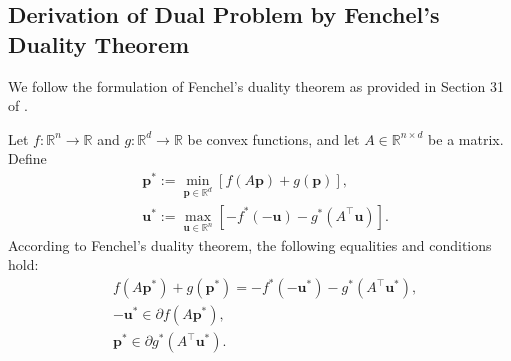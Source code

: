 %


\subsection{Derivation of Dual Problem by Fenchel's Duality Theorem} \label{app:fenchel}


We follow the formulation of Fenchel's duality theorem as provided in Section 31 of \cite{rockafellar1970convex}.

\begin{lemma} \label{lm:Fenchel-duality}
Let $f: \mathbb{R}^n\to\mathbb{R}$ and $g: \mathbb{R}^d\to\mathbb{R}$ be convex functions, and let $A\in\mathbb{R}^{n\times d}$ be a matrix. Define
\begin{align}
& \bm p^* := \min_{\bm p\in\mathbb{R}^d} [f(A\bm p) + g(\bm p)], \label{eq:FD-primal} \\
& \bm u^* := \max_{\bm u\in\mathbb{R}^n} [-f^*(-\bm u) - g^*(A^\top \bm u)]. \label{eq:FD-dual}
\end{align}
According to Fenchel's duality theorem, the following equalities and conditions hold:
\begin{align*}
& f(A\bm p^*) + g(\bm p^*) = -f^*(-\bm u^*) - g^*(A^\top \bm u^*), \\
& -\bm u^* \in \partial f(A \bm p^*), \\
& \bm p^* \in \partial g^*(A^\top \bm u^*).
\end{align*}
\end{lemma}

